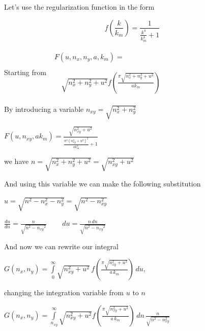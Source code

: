 \documentclass[twoside, 10pt]{article}
\begin{document}
\begin{multicols}{2}

    \section*{}\label{appendix-a.-integration-details}
\vspace{-3.5mm}

    Let's use the regularization function in the form

    \[f\left(\frac{k}{k_m}\right) = \frac{1}{\frac{k^{4}}{k_{m}^{4}} + 1}\]

    Starting from \(\begin{array}{c}
\begin{array}{ll}
F\left(u, n_x, n_y, a, k_m\right) = & \,\\
\end{array} \\
\begin{array}{rr}
\, & \sqrt{n_{x}^{2} + n_{y}^{2} + u^{2}} f\left(\frac{\pi \sqrt{n_{x}^{2} + n_{y}^{2} + u^{2}}}{a k_{m}}\right)\end{array}
\end{array}\)


    By introducing a variable \(n_{xy} = \sqrt{n_x^2 + n_y^2}\)

\noindent
    \(F\left(u, n_{xy}, ak_m\right) = \frac{\sqrt{n_{\mathit{xy}}^{2} + u^{2}}}{\frac{\pi^{4} {\left(n_{\mathit{xy}}^{2} + u^{2}\right)}^{2}}{\mathit{ak}_{m}^{4}} + 1}\)

    we have \(n = \sqrt{n_x^2 + n_y^2 + u^2} = \sqrt{n_{xy}^2 + u^2}\)

And using this variable we can make the following substitution

\(u = \sqrt{n^2 - n_x^2 - n_y^2} = \sqrt{n^2 - n_{xy}^2}\)

\(\frac{du}{dn} = \frac{n}{\sqrt{n^{2} - \mathit{n_{xy}}^{2}}}\) $\,\,\,\,\,\,\,\,\,$ \(d{u}= \frac{n\,d{n}}{\sqrt{n^{2} - \mathit{n_{xy}}^{2}}}\)

    And now we can rewrite our integral

 \(G\left(n_x, n_y\right) = \int\limits_{0}^{\infty}\sqrt{n_{xy}^2+u^2}\,
f\left(\frac{\pi\sqrt{n_{xy}^2+u^2}}{a\,k_m}\right)\,d{u},
\)

changing the integration variable from \(u\) to \(n\)

\noindent
$G\left(n_x, n_y\right) = \int\limits_{n_{xy}}^{\infty}\sqrt{n_{xy}^2+u^2}
 f\left(\frac{\pi\sqrt{n_{xy}^2+u^2}}{a\,k_m}\right)\,dn\,{\frac{n}{\sqrt{n^{2} - n_{xy}^{2}}}}$


\end{multicols}
\end{document}
